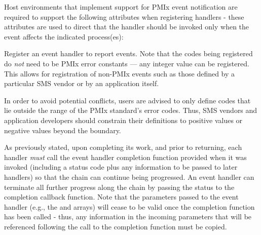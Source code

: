 
\divider

Host environments that implement support for \ac{PMIx} event notification are required to support the following attributes when registering handlers - these attributes are used to direct that the handler should be invoked only when the event affects the indicated process(es):


\reqattrend


\descr

Register an event handler to report events. Note that the codes being registered do \textit{not} need to be \ac{PMIx} error constants --- any integer value can be registered. This allows for registration of non-PMIx events such as those defined by a particular \ac{SMS} vendor or by an application itself.

\adviceuserstart
In order to avoid potential conflicts, users are advised to only define codes that lie outside the range of the \ac{PMIx} standard's error codes. Thus, \ac{SMS} vendors and application developers should constrain their definitions to positive values or negative values beyond the  boundary.
\adviceuserend


\adviceuserstart
As previously stated, upon completing its work, and prior to returning, each handler \textit{must} call the event handler completion function provided when it was invoked (including a status code plus any information to be passed to later handlers) so that the chain can continue being progressed. An event handler can terminate all further progress along the chain by passing the  status to the completion callback function. Note that the parameters passed to the event handler (e.g., the  and  arrays) will cease to be valid once the completion function has been called - thus, any information in the incoming parameters that will be referenced following the call to the completion function must be copied.
\adviceuserend

